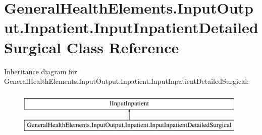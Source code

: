 \hypertarget{class_general_health_elements_1_1_input_output_1_1_inpatient_1_1_input_inpatient_detailed_surgical}{}\section{General\+Health\+Elements.\+Input\+Output.\+Inpatient.\+Input\+Inpatient\+Detailed\+Surgical Class Reference}
\label{class_general_health_elements_1_1_input_output_1_1_inpatient_1_1_input_inpatient_detailed_surgical}
Inheritance diagram for General\+Health\+Elements.\+Input\+Output.\+Inpatient.\+Input\+Inpatient\+Detailed\+Surgical\+:\begin{figure}[H]
\begin{center}
\leavevmode
\includegraphics[height=2.000000cm]{class_general_health_elements_1_1_input_output_1_1_inpatient_1_1_input_inpatient_detailed_surgical}
\end{center}
\end{figure}

